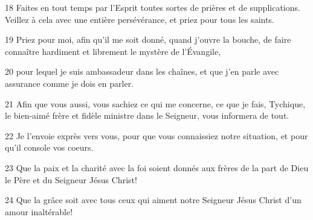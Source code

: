 \par 18 Faites en tout temps par l'Esprit toutes sortes de prières et de supplications. Veillez à cela avec une entière persévérance, et priez pour tous les saints.
\par 19 Priez pour moi, afin qu'il me soit donné, quand j'ouvre la bouche, de faire connaître hardiment et librement le mystère de l'Évangile,
\par 20 pour lequel je suis ambassadeur dans les chaînes, et que j'en parle avec assurance comme je dois en parler.
\par 21 Afin que vous aussi, vous sachiez ce qui me concerne, ce que je fais, Tychique, le bien-aimé frère et fidèle ministre dans le Seigneur, vous informera de tout.
\par 22 Je l'envoie exprès vers vous, pour que vous connaissiez notre situation, et pour qu'il console vos coeurs.
\par 23 Que la paix et la charité avec la foi soient donnés aux frères de la part de Dieu le Père et du Seigneur Jésus Christ!
\par 24 Que la grâce soit avec tous ceux qui aiment notre Seigneur Jésus Christ d'un amour inaltérable!


